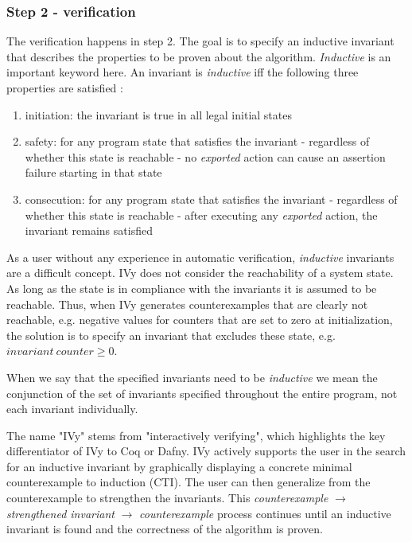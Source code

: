 \documentclass[fleqn]{article}
\begin{document}
\subsubsection{Step 2 - verification}
The verification happens in step 2. The goal is to specify an inductive invariant that describes the properties to be proven about the algorithm. \textit{Inductive} is an important
keyword here. An invariant is \textit{inductive} iff the following three properties are satisfied \cite{invariants}:
\begin{enumerate}
  \item initiation: the invariant is true in all legal initial states
  \item safety: for any program state that satisfies the invariant - regardless of whether this state is reachable - no \textit{exported} action can cause an assertion failure starting in that state
  \item consecution: for any program state that satisfies the invariant - regardless of whether this state is reachable - after executing any \textit{exported} action, the invariant remains satisfied
\end{enumerate}
As a user without any experience in automatic verification, \textit{inductive} invariants are a difficult concept.
IVy does not consider the reachability of a system state.  As long as the state is in compliance with the invariants it is assumed to be reachable.
Thus, when IVy generates counterexamples that are clearly not reachable, e.g. negative values for counters that are set to zero at initialization, the solution is to specify an invariant that excludes these state, e.g. $invariant\ counter \geq 0$.

When we say that the specified invariants need to be \textit{inductive} we mean the conjunction of the set of invariants specified throughout the entire program, not each invariant individually.

The name "IVy" stems from "interactively verifying", which highlights the key differentiator of IVy to Coq or Dafny.\cite{ivy}
IVy actively supports the user in the search for an inductive invariant by graphically displaying a concrete minimal counterexample to induction (CTI).
The user can then generalize from the counterexample to strengthen the invariants. This \textit{counterexample} $\rightarrow$ \textit{strengthened invariant} $\rightarrow$ \textit{counterexample} process continues
until an inductive invariant is found and the correctness of the algorithm is proven.
\end{document}
